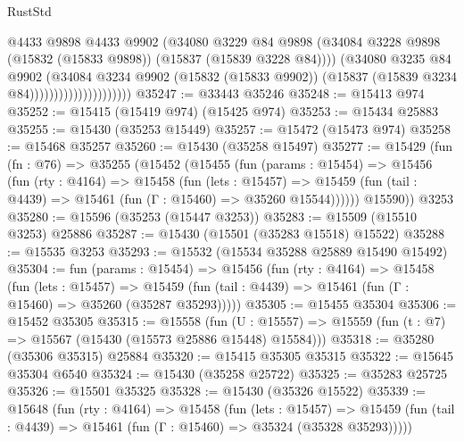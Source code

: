 \begin{lexlean}{RustStd}
\begin{coremodule}
{\begin{coremodule}
{{{{{{{{{{{{{{{{{{{{{{{{{{{{{{{{{{{{{{{{{{{{{{{{{{{{{{{{{{{{                                      @4433
                                      @9898
                                      @4433
                                      @9902
                                      (@34080
                                        @3229
                                        @84
                                        @9898
                                        (@34084
                                          @3228
                                          @9898
                                          (@15832 (@15833 @9898))
                                          (@15837 (@15839 @3228 @84))))
                                      (@34080
                                        @3235
                                        @84
                                        @9902
                                        (@34084
                                          @3234
                                          @9902
                                          (@15832 (@15833 @9902))
                                          (@15837 (@15839 @3234 @84)))))))))))))))))))))
@35247 := @33443 @35246
@35248 := @15413 @974
@35252 := @15415 (@15419 @974) (@15425 @974)
@35253 := @15434 @25883
@35255 := @15430 (@35253 @15449)
@35257 := @15472 (@15473 @974)
@35258 := @15468 @35257
@35260 := @15430 (@35258 @15497)
@35277 := @15429
    (fun (fn : @76) =>
    @35255
      (@15452
        (@15455
          (fun (params : @15454) =>
          @15456
            (fun (rty : @4164) =>
            @15458
              (fun (lets : @15457) =>
              @15459 (fun (tail : @4439) => @15461 (fun (Γ : @15460) => @35260 @15544))))))
        @15590))
    @3253
@35280 := @15596 (@35253 (@15447 @3253))
@35283 := @15509 (@15510 @3253) @25886
@35287 := @15430 (@15501 (@35283 @15518) @15522)
@35288 := @15535 @3253
@35293 := @15532 (@15534 @35288 @25889 @15490 @15492)
@35304 := fun (params : @15454) =>
  @15456
    (fun (rty : @4164) =>
    @15458
      (fun (lets : @15457) =>
      @15459 (fun (tail : @4439) => @15461 (fun (Γ : @15460) => @35260 (@35287 @35293)))))
@35305 := @15455 @35304
@35306 := @15452 @35305
@35315 := @15558
    (fun (U : @15557) => @15559 (fun (t : @7) => @15567 (@15430 (@15573 @25886 @15448) @15584)))
@35318 := @35280 (@35306 @35315) @25884
@35320 := @15415 @35305 @35315
@35322 := @15645 @35304 @6540
@35324 := @15430 (@35258 @25722)
@35325 := @35283 @25725
@35326 := @15501 @35325
@35328 := @15430 (@35326 @15522)
@35339 := @15648
    (fun (rty : @4164) =>
    @15458
      (fun (lets : @15457) =>
      @15459 (fun (tail : @4439) => @15461 (fun (Γ : @15460) => @35324 (@35328 @35293)))))
}}}}}}}}}}}}}}}}}}}}}}}}}}}}}}}}}}}}}}}}}}}}}}}}}}}}}}}}}}}}
\end{coremodule}}
\end{coremodule}
\end{lexlean}
